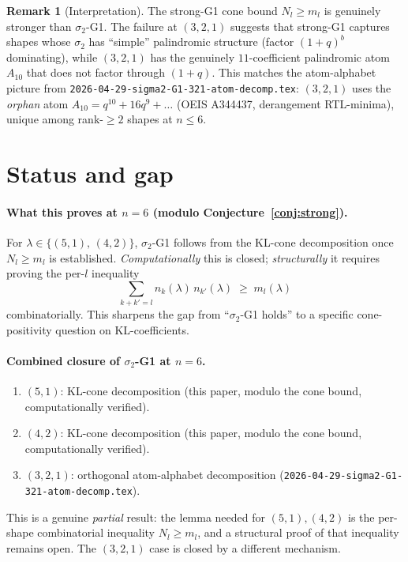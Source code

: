 \documentclass{article}
\theoremstyle{definition}
\newtheorem{remark}[theorem]{Remark}
\begin{document}
\begin{remark}[Interpretation]
The strong-G1 cone bound $N_l \geq m_l$ is genuinely stronger than $\sigma_2$-G1.
The failure at $(3,2,1)$ suggests that strong-G1 captures shapes whose
$\sigma_2$ has ``simple'' palindromic structure (factor $(1+q)^b$ dominating),
while $(3,2,1)$ has the genuinely $11$-coefficient palindromic atom $A_{10}$
that does not factor through $(1+q)$.
This matches the atom-alphabet picture from
\texttt{2026-04-29-sigma2-G1-321-atom-decomp.tex}: $(3,2,1)$ uses the
\emph{orphan} atom $A_{10} = q^{10}+16q^9+\dots$ (OEIS A344437, derangement
RTL-minima), unique among rank-$\geq 2$ shapes at $n \leq 6$.
\end{remark}

\section{Status and gap}

\paragraph{What this proves at $n=6$ (modulo Conjecture~\ref{conj:strong}).}
For $\lambda \in \{(5,1),\,(4,2)\}$, $\sigma_2$-G1 follows from the
KL-cone decomposition once $N_l \geq m_l$ is established.
\emph{Computationally} this is closed; \emph{structurally} it requires
proving the per-$l$ inequality
\[
  \sum_{k+k'=l} n_k(\lambda)\, n_{k'}(\lambda) \;\geq\; m_l(\lambda)
\]
combinatorially. This sharpens the gap from ``$\sigma_2$-G1 holds'' to a
specific cone-positivity question on KL-coefficients.

\paragraph{Combined closure of $\sigma_2$-G1 at $n=6$.}
\begin{enumerate}
\item $(5,1)$: KL-cone decomposition (this paper, modulo the cone bound, computationally verified).
\item $(4,2)$: KL-cone decomposition (this paper, modulo the cone bound, computationally verified).
\item $(3,2,1)$: orthogonal atom-alphabet decomposition (\texttt{2026-04-29-sigma2-G1-321-atom-decomp.tex}).
\end{enumerate}

This is a genuine \emph{partial} result: the lemma needed for $(5,1), (4,2)$
is the per-shape combinatorial inequality $N_l \geq m_l$, and a structural
proof of that inequality remains open. The $(3,2,1)$ case is closed by a
different mechanism.
\end{document}

